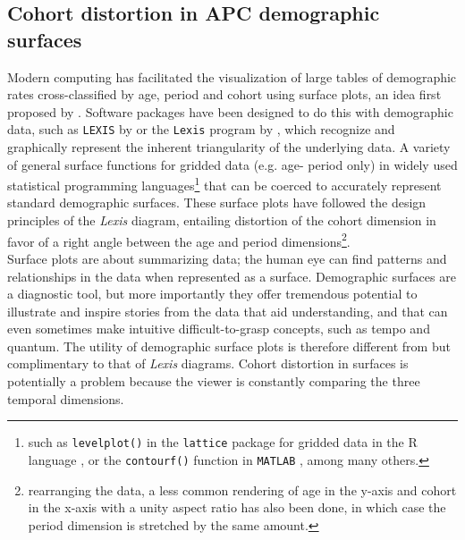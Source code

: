 \documentclass[a4paper]{article}
\begin{document}
\subsection*{Cohort distortion in APC demographic surfaces}
Modern computing has facilitated the visualization of large tables of demographic rates cross-classified by age, period and cohort using surface plots, an idea first proposed by \citet{arthur1984some}. Software packages have been designed to do this with demographic data, such as \texttt{LEXIS} by \citet{vaupel1987thousands} or the \texttt{Lexis} program by \citet{andreev1999overview}, which recognize and graphically represent the inherent triangularity of the underlying data. A variety of general surface functions for gridded data (e.g. age- period only) in widely used statistical programming languages\footnote{such as \texttt{levelplot()} in the \texttt{lattice} package \citep{sarkar2008lattice} for gridded data in the R language \citep{ihaka1996r}, or the \texttt{contourf()} function in \texttt{MATLAB} \citep{MATLAB2010}, among many others.} that can be coerced to accurately represent standard demographic surfaces. These surface plots have followed the design principles of the \textit{Lexis} diagram, entailing distortion of the cohort dimension in favor of a right angle between the age and period dimensions\footnote{rearranging the data, a less common rendering of age in the y-axis and cohort in the x-axis with a unity aspect ratio has also been done, in which case the period dimension is stretched by the same amount.}.\\

Surface plots are about summarizing data; the human eye can find patterns and relationships in the data when represented as a surface. Demographic surfaces are a diagnostic tool, but more importantly they offer tremendous potential to illustrate and inspire stories from the data that aid understanding, and that can even sometimes make intuitive difficult-to-grasp concepts, such as tempo and quantum. The utility of demographic surface plots is therefore different from but complimentary to that of \textit{Lexis} diagrams. Cohort distortion in surfaces is potentially a problem because the viewer is constantly comparing the three temporal dimensions.
\end{document}
